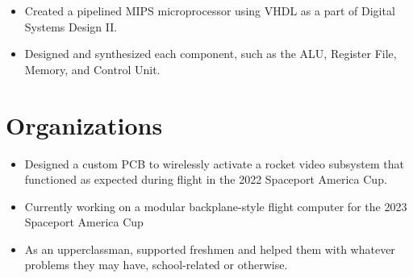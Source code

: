 \documentclass[]{deedy-resume-openfont}
\begin{document}
\begin{minipage}[t]{0.66\textwidth}
\sectionsep


\begin{itemize}
    \setlength\itemsep{0pt}
    \item Created a pipelined MIPS microprocessor using VHDL as a part of Digital Systems Design II.
    \item Designed and synthesized each component, such as the ALU, Register File, Memory, and Control Unit.
\end{itemize}




\section{Organizations}

\begin{itemize}
    \setlength\itemsep{0pt}
    \item Designed a custom PCB to wirelessly activate a rocket video subsystem that functioned as expected during flight in the 2022 Spaceport America Cup.
    \item Currently working on a modular backplane-style flight computer for the 2023 Spaceport America Cup
\end{itemize}


\sectionsep

\begin{itemize}
    \setlength\itemsep{0pt}
    \item As an upperclassman, supported freshmen and helped them with whatever problems they may have, school-related or otherwise.
\end{itemize}



\end{minipage}
\end{document}
